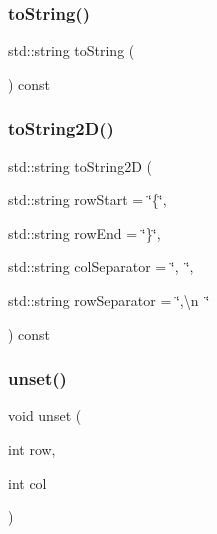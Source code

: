 \subsubsection{\texorpdfstring{to\+String()}{toString()}}
{\footnotesize\ttfamily std\+::string to\+String (\begin{DoxyParamCaption}{ }\end{DoxyParamCaption}) const}

\mbox{\label{classSparseGrid_a8e636ad8b56218c7e0162d6c1bd78b39}} 
\subsubsection{\texorpdfstring{to\+String2\+D()}{toString2D()}}
{\footnotesize\ttfamily std\+::string to\+String2D (\begin{DoxyParamCaption}\item[{std\+::string}]{row\+Start = {\ttfamily \char`\"{}\{\char`\"{}},  }\item[{std\+::string}]{row\+End = {\ttfamily \char`\"{}\}\char`\"{}},  }\item[{std\+::string}]{col\+Separator = {\ttfamily \char`\"{},~\char`\"{}},  }\item[{std\+::string}]{row\+Separator = {\ttfamily \char`\"{},\textbackslash{}n~\char`\"{}} }\end{DoxyParamCaption}) const}

\mbox{\label{classSparseGrid_ae8cd7ce6866d5bccb4d900047b00a9f0}} 
\subsubsection{\texorpdfstring{unset()}{unset()}\hspace{0.1cm}{\footnotesize\ttfamily [1/2]}}
{\footnotesize\ttfamily void unset (\begin{DoxyParamCaption}\item[{int}]{row,  }\item[{int}]{col }\end{DoxyParamCaption})}

\mbox{\label{classSparseGrid_a6c6a0cedc17fead9553340c164db6eb3}} 
